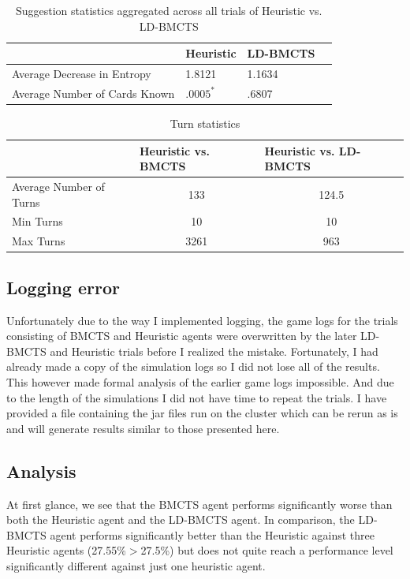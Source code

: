 \documentclass[msc, ai, twoside, notimes, logo, parskip, leftchapter, normalheadings]{infthesis}
\begin{document}
\begin{table}[h!]
\centering
\caption{Suggestion statistics aggregated across all trials of Heuristic vs. LD-BMCTS}
\begin{tabular}{l|lll}
& \multicolumn{1}{l|}{Heuristic} & LD-BMCTS \\ \hline \hline
Average Decrease in Entropy & 1.8121 & 1.1634 \\
Average Number of Cards Known & \(.0005^*\) & .6807 \\
\end{tabular}
\end{table}


\begin{table}[h!]
\centering
\caption{Turn statistics}
\begin{tabular}{l|ll}
& \multicolumn{1}{l|}{Heuristic vs. BMCTS} & \multicolumn{1}{l}{Heuristic vs. LD-BMCTS} \\ \hline \hline
Average Number of Turns & \multicolumn{1}{c}{133} & \multicolumn{1}{c}{124.5} \\
Min Turns & \multicolumn{1}{c}{10} & \multicolumn{1}{c}{10} \\
Max Turns & \multicolumn{1}{c}{3261} & \multicolumn{1}{c}{963}
\end{tabular}
\end{table}

\subsection{Logging error}
Unfortunately due to the way I implemented logging, the game logs for the trials consisting of BMCTS and Heuristic agents were overwritten by the later LD-BMCTS and Heuristic trials before I realized the mistake. Fortunately, I had already made a copy of the simulation logs so I did not lose all of the results. This however made formal analysis of the earlier game logs impossible. And due to the length of the simulations I did not have time to repeat the trials. I have provided a file containing the jar files run on the cluster which can be rerun as is and will generate results similar to those presented here.

\subsection{Analysis}
At first glance, we see that the BMCTS agent performs significantly worse than both the Heuristic agent and the LD-BMCTS agent. In comparison, the LD-BMCTS agent performs significantly better than the Heuristic against three Heuristic agents (27.55\%\(>\)27.5\%) but does not quite reach a performance level significantly different against just one heuristic agent. 
\end{document}
